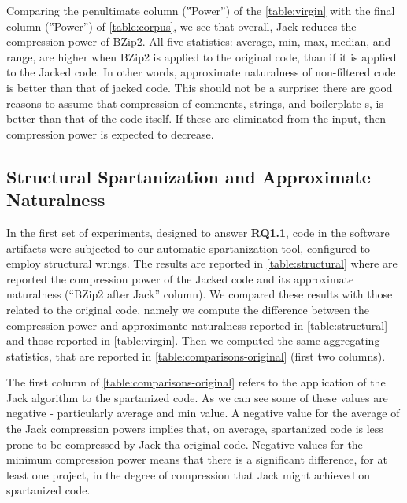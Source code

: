Comparing the penultimate column (‟Power”) of the \cref{table:virgin}
with the final column (‟Power”) of
\cref{table:corpus}, we see that overall, Jack reduces the compression power of
BZip2. All five statistics: average, min, max, median, and range, are higher
when BZip2 is applied to the original code, than if it is applied to the Jacked
code. In other words, approximate naturalness of non-filtered code is better
than that of jacked code. This should not be a surprise: there are good reasons
to assume that compression of comments, strings, and boilerplate s,
is better than that of the code itself. If these are eliminated from the input,
then compression power is expected to decrease.

\subsection{Structural Spartanization and Approximate Naturalness}

In the first set of experiments, designed to answer \textbf{RQ1.1}, \Java code
in the software artifacts were subjected to our automatic spartanization
tool, configured to employ structural wrings.
The results are reported in \cref{table:structural} where are reported
the compression power of the Jacked code and its approximate
naturalness (``BZip2 after Jack'' column).
We compared these results %
with those related to the original code, namely we compute the difference 
between the compression power and approximante naturalness reported in \cref{table:structural}
and those reported in \cref{table:virgin}.
Then we computed the same aggregating statistics, that are reported in 
\cref{table:comparisons-original} (first two columns).

The first column of \cref{table:comparisons-original} refers to the application of the Jack
algorithm to the spartanized code. As we can see some of these values are negative - particularly 
average and min value. 
A negative value for the average of the Jack compression powers implies that, 
on average, spartanized code is less prone to be compressed by Jack tha original code. 
Negative values for the minimum compression power means
that there is a significant difference, for at least one project, in the degree of compression
that Jack might achieved on spartanized code. 

